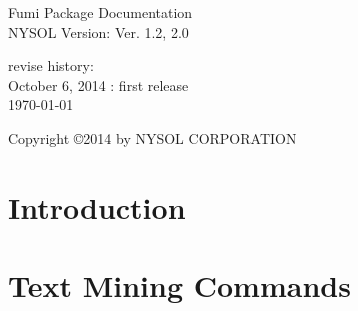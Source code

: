 \documentclass[a4paper]{book}
\begin{document}
\begin{titlepage}
\begin{center}
{\huge Fumi Package Documentation}\\
\vspace{10truept}
{\normalsize NYSOL Version: Ver. 1.2, 2.0}\\
\vspace{1cm}

revise history:\\
October 6, 2014 : first release\\
\vspace{18cm}
{\small \today}

{\small Copyright \copyright 2014 by NYSOL CORPORATION}
\end{center}
\end{titlepage}

\setcounter{tocdepth}{1}
\tableofcontents


\chapter{Introduction}




\chapter{Text Mining Commands}





\end{document}
